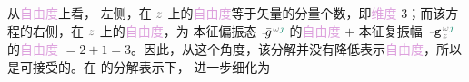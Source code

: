 从\textcolor{Plum}{自由度}上看， 左侧，在 $\mathcolor{gray}{z}$ 上的\textcolor{Plum}{自由度}等于矢量的分量个数，即\textcolor{Plum}{维度} 3；而该方程的右侧，在 $\mathcolor{gray}{z}$ 上的\textcolor{Plum}{自由度}，为 \textcolor{PineGreen}{本征偏振态} $\Xint{{}^{}_{\mathcolor{gray}{-}}}{10}{\bar{g}}^{\;\!\mathcolor{gray}{\omega} \textcolor{PineGreen}{\jmath}}$ 的\textcolor{Plum}{自由度} $+$ \textcolor{PineGreen}{本征复振幅} $\Xint{\begin{smallmatrix} ~ \\ {}^{}_{\mathcolor{gray}{-}} \\ ~ \end{smallmatrix}}{09}{\mathtt{g}}^{\;\!\mathcolor{gray}{\omega} \textcolor{PineGreen}{\jmath}}_{\;\! \mathcolor{gray}{z}}$ 的\textcolor{Plum}{自由度} $= 2 + 1 = 3$。因此，从这个角度，该分解并没有降低表示\textcolor{Plum}{自由度}，所以是可接受的。在  的分解表示下， 进一步细化为
